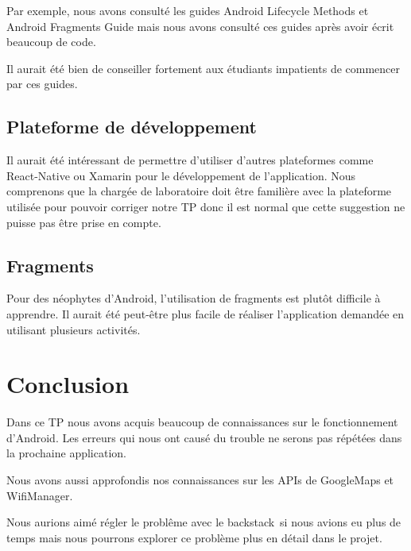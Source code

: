 \documentclass[12pt]{article}
\begin{document}
	Par exemple, nous avons consulté les guides Android Lifecycle Methods
	 et Android Fragments Guide 
	mais nous avons consulté ces guides après avoir écrit beaucoup de code.

	Il aurait été bien de conseiller fortement aux étudiants impatients de
	commencer par ces guides.

\subsection{Plateforme de développement}

	Il aurait été intéressant de permettre d'utiliser d'autres plateformes comme
	React-Native ou Xamarin pour le développement de l'application.  Nous
	comprenons que la chargée de laboratoire doit être familière avec la
	plateforme utilisée pour pouvoir corriger notre TP donc il est normal que
	cette suggestion ne puisse pas être prise en compte.

\subsection{Fragments}

	Pour des néophytes d'Android, l'utilisation de fragments est plutôt
	difficile à apprendre.  Il aurait été peut-être plus facile de réaliser
	l'application demandée en utilisant plusieurs activités.

\section{Conclusion}

	Dans ce TP nous avons acquis beaucoup de connaissances sur le fonctionnement
	d'Android.  Les erreurs qui nous ont causé du trouble ne serons pas répétées
	dans la prochaine application.

	Nous avons aussi approfondis nos connaissances sur les APIs de GoogleMaps et
	WifiManager.

	Nous aurions aimé régler le problême avec le \og backstack\fg\ si nous
	avions eu plus de temps mais nous pourrons explorer ce problème plus en
	détail dans le projet.

\begin{raggedright}


\end{raggedright}
\end{document}
